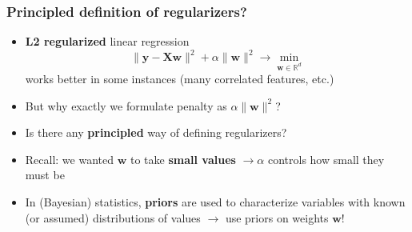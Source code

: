 \documentclass[usenames,dvipsnames,aspectratio=169]{beamer}
\begin{document}
\begin{frame}
\frametitle{Principled definition of regularizers?}

\begin{itemize}

  \item \textbf{L2 regularized} linear regression
  \[
    \lVert \bm{y} - \bm{X} \mathbf{w}  \rVert^2 
    +
    \alpha \lVert \mathbf{w} \rVert^2 
    \to 
    \min_{\mathbf{w} \in \mathbb{R}^d}
  \]
  works better in some instances (many correlated features, etc.)

  \pause
  \item But why exactly we formulate penalty as $\alpha \lVert \mathbf{w} \rVert^2 $? 

  \pause
  \item Is there any \textbf{principled} way of defining regularizers?

  \pause
  \item Recall: we wanted $\mathbf{w}$ to take \textbf{small values} $\to \alpha$ controls how small they must be

  \pause
  \item In (Bayesian) statistics, \textbf{priors}
  are used to characterize variables
  with known (or assumed) distributions of values
  $\to$ use priors on weights $\mathbf{w}$!

\end{itemize}

\end{frame}
\end{document}

